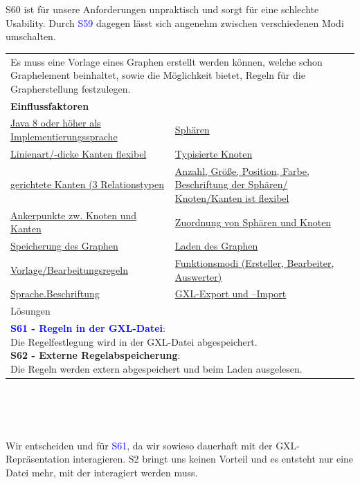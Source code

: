 \documentclass[enabledeprecatedfontcommands,fontsize=11pt,paper=a4,twoside]{scrartcl}
\newcounter{one}
\newcommand{\cb}[1]{{\textcolor{blue}{#1}}}
\begin{document}
\begin{onehalfspace}
	S60 ist für unsere Anforderungen unpraktisch und sorgt für eine schlechte Usability. Durch \cb{S59} dagegen lässt sich angenehm zwischen verschiedenen Modi umschalten. 
\end{onehalfspace}



\newpage
\hspace{-0.65cm}
\begin{tabular} {|p{8cm} p{8cm}|}
	\hline
	\rowcolor{prob}\multicolumn{2}{|l|}{\parbox{16cm}{\textbf{24: Vorlage}}} \\  \hline\hline 
	\multicolumn{2}{|l|}{\parbox{16cm}{Es muss eine Vorlage eines Graphen erstellt werden können, welche schon Graphelement beinhaltet, sowie die Möglichkeit bietet, Regeln für die Grapherstellung festzulegen.}}\rule{0pt}{1ex}\\ [1ex] \hline
	\multicolumn{2}{|l|}{\textbf{Einflussfaktoren}}\\
	\hyperlink{b}{Java 8 oder höher als Implementierungssprache}  & 
	\hyperlink {n}{Sphären} \\
	\hyperlink {o}{Linienart/-dicke Kanten flexibel}&
	\hyperlink {p}{Typisierte Knoten} \\
	\hyperlink {q}{gerichtete Kanten (3 Relationstypen} &
	\hyperlink {r}{Anzahl, Größe, Position, Farbe, Beschriftung der Sphären/ Knoten/Kanten ist flexibel} \\
	\hyperlink {s}{Ankerpunkte zw. Knoten und Kanten} &
	\hyperlink {t}{Zuordnung von Sphären und Knoten} \\
	\hyperlink {v}{Speicherung des Graphen} &
	\hyperlink {w}{Laden des Graphen} \\
	\hyperlink {y}{Vorlage/Bearbeitungsregeln} &
	\hyperlink {z}{Funktionsmodi (Ersteller, Bearbeiter, Auswerter)} \\
	\hyperlink {hh}{Sprache.Beschriftung} &
	\hyperlink {jj}{GXL-Export und –Import} 
	\\ \hline
	\multicolumn{2}{|l|}{Lösungen} \\
	\multicolumn{2}{|l|}{\parbox{16cm}{
			\textbf{\cb{\hypertarget{vvv}{S61 - Regeln in der GXL-Datei}}}: \\
			Die Regelfestlegung wird in der GXL-Datei abgespeichert. \\
			\textbf{S62 - Externe Regelabspeicherung}: \\
			Die Regeln werden extern abgespeichert und beim Laden ausgelesen. 
	} }\\ [6ex] \hline
\end{tabular}\\ \\ \\
\begin{onehalfspace}
	Wir entscheiden und für \cb{S61}, da wir sowieso dauerhaft mit der GXL-Repräsentation interagieren. S2 bringt uns keinen Vorteil und es entsteht nur eine Datei mehr, mit der interagiert werden muss. 
\end{onehalfspace}
\end{document}
